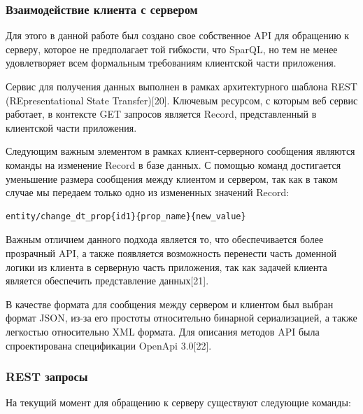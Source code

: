 \documentclass[12pt]{article}
\begin{document}
\subsubsection{Взаимодействие клиента с сервером}
\qquad Для этого в данной работе был создано свое собственное API для обращению к серверу, которое не предполагает той гибкости, что SparQL, но тем не менее удовлетворяет всем формальным требованиям клиентской части приложения.

Сервис для получения данных выполнен в рамках архитектурного шаблона REST (REpresentational State Transfer)[20]. Ключевым ресурсом, с которым веб сервис работает, в контексте GET запросов является Record, представленный в клиентской части приложения.

Следующим важным элементом в рамках клиент-серверного сообщения являются команды на изменение Record в базе данных. С помощью команд достигается уменьшение размера сообщения между клиентом и сервером, так как в таком случае мы передаем только одно из измененных значений Record:

\begin{verbatim}entity/change_dt_prop{id1}{prop_name}{new_value} \end{verbatim}

Важным отличием данного подхода является то, что обеспечивается более прозрачный API, а также появляется возможность перенести часть доменной логики из клиента в серверную часть приложения, так как задачей клиента является обеспечить представление данных[21].

В качестве формата для сообщения между сервером и клиентом был выбран формат JSON, из-за его простоты относительно бинарной сериализацией, а также легкостью относительно XML формата. Для описания методов API была спроектирована спецификации OpenApi 3.0[22].

\subsubsection{REST запросы}
На текущий момент для обращению к серверу существуют следующие команды:
\end{document}
